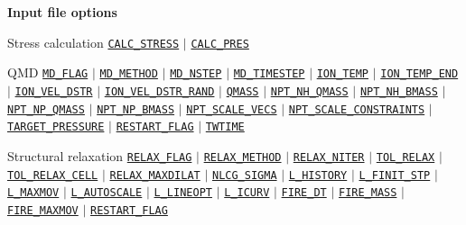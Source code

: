 \begin{frame}[allowframebreaks]{\textbf{Input file options}}
  \vspace{-2mm}
  \begin{block}{Stress calculation}
  \hyperlink{CALC_STRESS}{\texttt{CALC\_STRESS}} $\vert$
  \hyperlink{CALC_PRES}{\texttt{CALC\_PRES}}
  \end{block}
  \vspace{-2mm}
  
  \begin{block}{QMD}
  \hyperlink{MD_FLAG}{\texttt{MD\_FLAG}} $\vert$
  \hyperlink{MD_METHOD}{\texttt{MD\_METHOD}} $\vert$
  \hyperlink{MD_NSTEP}{\texttt{MD\_NSTEP}} $\vert$
  \hyperlink{MD_TIMESTEP}{\texttt{MD\_TIMESTEP}} $\vert$
  \hyperlink{ION_TEMP}{\texttt{ION\_TEMP}} $\vert$
  \hyperlink{ION_TEMP_END}{\texttt{ION\_TEMP\_END}} $\vert$
  \hyperlink{ION_VEL_DSTR}{\texttt{ION\_VEL\_DSTR}} $\vert$
  \hyperlink{ION_VEL_DSTR_RAND}{\texttt{ION\_VEL\_DSTR\_RAND}} $\vert$
  \hyperlink{QMASS}{\texttt{QMASS}} $\vert$
  \hyperlink{NPT_NH_QMASS}{\texttt{NPT\_NH\_QMASS}} $\vert$
  \hyperlink{NPT_NH_BMASS}{\texttt{NPT\_NH\_BMASS}} $\vert$
  \hyperlink{NPT_NP_QMASS}{\texttt{NPT\_NP\_QMASS}} $\vert$
  \hyperlink{NPT_NP_BMASS}{\texttt{NPT\_NP\_BMASS}} $\vert$
  \hyperlink{NPT_SCALE_VECS}{\texttt{NPT\_SCALE\_VECS}} $\vert$
  \hyperlink{NPT_SCALE_CONSTRAINTS}{\texttt{NPT\_SCALE\_CONSTRAINTS}} $\vert$ 
  \hyperlink{TARGET_PRESSURE}{\texttt{TARGET\_PRESSURE}} $\vert$
  \hyperlink{RESTART_FLAG}{\texttt{RESTART\_FLAG}} $\vert$
  \hyperlink{TWTIME}{\texttt{TWTIME}}
  \end{block}
  
  \vspace{-2mm}
  \begin{block}{Structural relaxation}
  \hyperlink{RELAX_FLAG}{\texttt{RELAX\_FLAG}} $\vert$
  \hyperlink{RELAX_METHOD}{\texttt{RELAX\_METHOD}} $\vert$
  \hyperlink{RELAX_NITER}{\texttt{RELAX\_NITER}} $\vert$
  \hyperlink{TOL_RELAX}{\texttt{TOL\_RELAX}} $\vert$
  \hyperlink{TOL_RELAX_CELL}{\texttt{TOL\_RELAX\_CELL}} $\vert$
  \hyperlink{RELAX_MAXDILAT}{\texttt{RELAX\_MAXDILAT}} $\vert$
  \hyperlink{NLCG_SIGMA}{\texttt{NLCG\_SIGMA}} $\vert$
  \hyperlink{L_HISTORY}{\texttt{L\_HISTORY}} $\vert$
  \hyperlink{L_FINIT_STP}{\texttt{L\_FINIT\_STP}} $\vert$
  \hyperlink{L_MAXMOV}{\texttt{L\_MAXMOV}} $\vert$
  \hyperlink{L_AUTOSCALE}{\texttt{L\_AUTOSCALE}} $\vert$
  \hyperlink{L_LINEOPT}{\texttt{L\_LINEOPT}} $\vert$
  \hyperlink{L_ICURV}{\texttt{L\_ICURV}} $\vert$
  \hyperlink{FIRE_DT}{\texttt{FIRE\_DT}} $\vert$
  \hyperlink{FIRE_MASS}{\texttt{FIRE\_MASS}} $\vert$
  \hyperlink{FIRE_MAXMOV}{\texttt{FIRE\_MAXMOV}} $\vert$
  \hyperlink{RESTART_FLAG}{\texttt{RESTART\_FLAG}}
  \end{block}


\end{frame}
